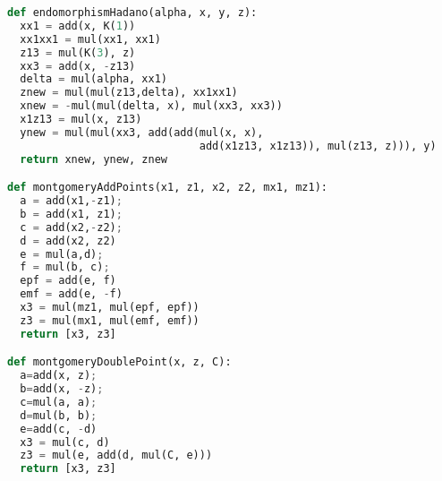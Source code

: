 \begin{lstlisting}[language=python]
def endomorphismHadano(alpha, x, y, z):
  xx1 = add(x, K(1))
  xx1xx1 = mul(xx1, xx1)
  z13 = mul(K(3), z)
  xx3 = add(x, -z13)
  delta = mul(alpha, xx1)
  znew = mul(mul(z13,delta), xx1xx1)
  xnew = -mul(mul(delta, x), mul(xx3, xx3))
  x1z13 = mul(x, z13)
  ynew = mul(mul(xx3, add(add(mul(x, x), 
                              add(x1z13, x1z13)), mul(z13, z))), y)
  return xnew, ynew, znew

def montgomeryAddPoints(x1, z1, x2, z2, mx1, mz1):
  a = add(x1,-z1); 
  b = add(x1, z1); 
  c = add(x2,-z2); 
  d = add(x2, z2)
  e = mul(a,d); 
  f = mul(b, c);
  epf = add(e, f)
  emf = add(e, -f)
  x3 = mul(mz1, mul(epf, epf))
  z3 = mul(mx1, mul(emf, emf))
  return [x3, z3]

def montgomeryDoublePoint(x, z, C):
  a=add(x, z);
  b=add(x, -z);
  c=mul(a, a); 
  d=mul(b, b); 
  e=add(c, -d)
  x3 = mul(c, d)
  z3 = mul(e, add(d, mul(C, e)))
  return [x3, z3]
\end{lstlisting}
